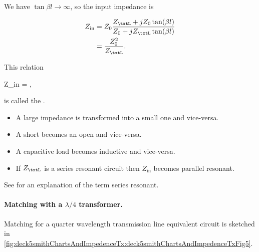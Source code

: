 We have \( \tan \beta l \rightarrow \infty \), so the input impedance is

\begin{equation}\label{eqn:uwavesDeck5SmithChartCore:240}
\begin{aligned}
Z_{\textrm{in}}
&= Z_0 \frac{ Z_\txtL + j Z_0 \tan(\beta l) }{ Z_0 + j Z_\txtL \tan(\beta l)}
\\ &= \frac{Z_0^2}{Z_\txtL}.
\end{aligned}
\end{equation}

This relation

{
Z_{\textrm{in}}
= ,
}

is called the .

\begin{itemize}
\item A large impedance is transformed into a small one and vice-versa.
\item A short becomes an open and vice-versa.
\item A capacitive load becomes inductive and vice-versa.
\item If \( Z_\txtL \) is a series resonant circuit then \( Z_{\textrm{in}} \) becomes parallel resonant.
\end{itemize}

See \citep{seriesResonance} for an explanation of the term series resonant.

\paragraph{Matching with a \( \lambda/4 \) transformer.}

Matching for a quarter wavelength transmission line equivalent circuit is sketched in \cref{fig:deck5smithChartsAndImpedenceTx:deck5smithChartsAndImpedenceTxFig5}.


